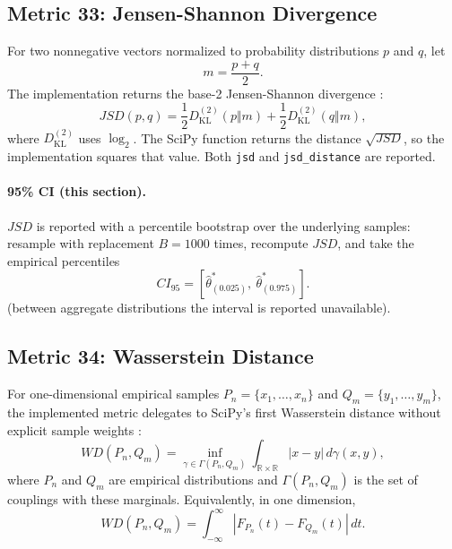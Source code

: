 \documentclass[11pt]{article}
\newcommand{\KL}{D_{\mathrm{KL}}}
\newcommand{\R}{\mathbb{R}}
\begin{document}
\subsection{Metric 33: Jensen-Shannon Divergence}

For two nonnegative vectors normalized to probability distributions $p$ and $q$,
let
\begin{equation}
m=\frac{p+q}{2}.
\end{equation}
The implementation returns the base-2 Jensen-Shannon divergence
\cite{lin1991}:
\begin{equation}
JSD(p,q)=
\frac{1}{2}\KL^{(2)}(p\Vert m)+\frac{1}{2}\KL^{(2)}(q\Vert m),
\end{equation}
where $\KL^{(2)}$ uses $\log_2$. The SciPy function returns the distance
$\sqrt{JSD}$, so the implementation squares that value. Both \texttt{jsd} and
\texttt{jsd\_distance} are reported.


\paragraph{95\% CI (this section).} $JSD$ is reported with a percentile bootstrap over the underlying samples: resample with replacement $B=1000$ times, recompute $JSD$, and take the empirical percentiles
\begin{equation}
CI_{95}=\left[\hat\theta^{\ast}_{(0.025)},\ \hat\theta^{\ast}_{(0.975)}\right].
\end{equation} (between aggregate distributions the interval is reported unavailable).

\subsection{Metric 34: Wasserstein Distance}

For one-dimensional empirical samples $P_n=\{x_1,\ldots,x_n\}$ and
$Q_m=\{y_1,\ldots,y_m\}$, the implemented metric delegates to SciPy's first
Wasserstein distance without explicit sample weights
\cite{villani2009}:
\begin{equation}
WD(P_n,Q_m)=\inf_{\gamma\in\Gamma(P_n,Q_m)}
\int_{\R\times\R}|x-y|\,d\gamma(x,y),
\end{equation}
where $P_n$ and $Q_m$ are empirical distributions and $\Gamma(P_n,Q_m)$ is the
set of couplings with these marginals.
Equivalently, in one dimension,
\begin{equation}
WD(P_n,Q_m)=\int_{-\infty}^{\infty}|F_{P_n}(t)-F_{Q_m}(t)|\,dt.
\end{equation}
\end{document}
